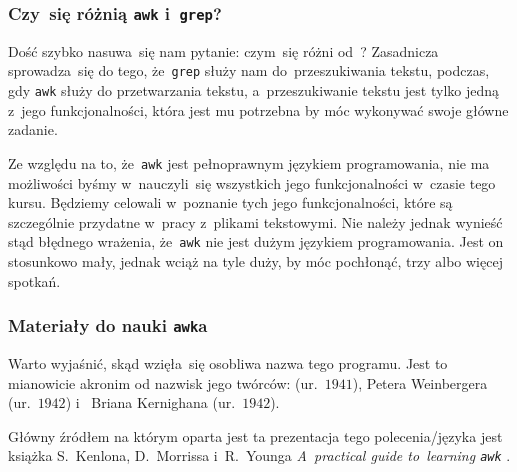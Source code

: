 \documentclass[10pt,t]{beamer}
\begin{document}
\begin{frame}
  \frametitle{Czy~się różnią \texttt{awk} i~\texttt{grep}?}


  Dość szybko nasuwa~się nam pytanie: czym~się różni
  od~?
  Zasadnicza sprowadza~się do tego, że~\texttt{grep} służy nam
  do~\alert{przeszukiwania} tekstu, podczas, gdy \texttt{awk} służy
  do \alert{przetwarzania} tekstu, a~przeszukiwanie tekstu jest tylko
  jedną z~jego funkcjonalności, która jest mu potrzebna by móc wykonywać
  swoje główne zadanie.

  Ze względu na to, że~\texttt{awk} jest pełnoprawnym językiem
  programowania, nie ma możliwości byśmy w~nauczyli~się wszystkich jego
  funkcjonalności w~czasie tego kursu. Będziemy celowali w~poznanie tych
  jego funkcjonalności, które są szczególnie przydatne w~pracy z~plikami
  tekstowymi. Nie należy jednak wynieść stąd błędnego wrażenia,
  że~\texttt{awk} nie jest dużym językiem programowania. Jest on
  stosunkowo mały, jednak wciąż na tyle duży, by móc pochłonąć, trzy albo
  więcej spotkań.

\end{frame}





\begin{frame}
  \frametitle{Materiały do nauki \texttt{awk}a}


  Warto wyjaśnić, skąd wzięła~się osobliwa nazwa tego programu. Jest to
  mianowicie akronim od nazwisk jego twórców:
  (ur.~$1941$),
  {Petera Weinbergera} (ur.~$1942$)
  i~
  {Briana Kernighana} (ur.~$1942$).

  Główny źródłem na którym oparta jest ta prezentacja tego polecenia/języka
  jest książka S.~Kenlona, D.~Morrissa i~R.~Younga
  {\textit{A~practical guide to~learning \texttt{awk}}}
\parencite{Kenlon-Morriss-Young-A-practical-guide-to-learning-awk-Ver-2025}.

\end{frame}
\end{document}
